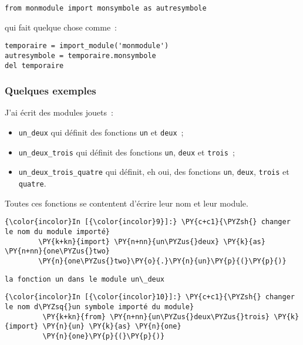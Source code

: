     \begin{verbatim}
from monmodule import monsymbole as autresymbole
\end{verbatim}

    qui fait quelque chose comme~:

    \begin{verbatim}
temporaire = import_module('monmodule')
autresymbole = temporaire.monsymbole
del temporaire
\end{verbatim}

    \hypertarget{quelques-exemples}{%
\subsubsection{Quelques exemples}\label{quelques-exemples}}

    J'ai écrit des modules jouets~:

\begin{itemize}
\tightlist
\item
  \texttt{un\_deux} qui définit des fonctions \texttt{un} et
  \texttt{deux}~;
\item
  \texttt{un\_deux\_trois} qui définit des fonctions \texttt{un},
  \texttt{deux} et \texttt{trois}~;
\item
  \texttt{un\_deux\_trois\_quatre} qui définit, eh oui, des fonctions
  \texttt{un}, \texttt{deux}, \texttt{trois} et \texttt{quatre}.
\end{itemize}

Toutes ces fonctions se contentent d'écrire leur nom et leur module.

    \begin{Verbatim}[commandchars=\\\{\}]
{\color{incolor}In [{\color{incolor}9}]:} \PY{c+c1}{\PYZsh{} changer le nom du module importé}
        \PY{k+kn}{import} \PY{n+nn}{un\PYZus{}deux} \PY{k}{as} \PY{n+nn}{one\PYZus{}two}
        \PY{n}{one\PYZus{}two}\PY{o}{.}\PY{n}{un}\PY{p}{(}\PY{p}{)}
\end{Verbatim}


    \begin{Verbatim}[commandchars=\\\{\}]
la fonction un dans le module un\_deux

    \end{Verbatim}

    \begin{Verbatim}[commandchars=\\\{\}]
{\color{incolor}In [{\color{incolor}10}]:} \PY{c+c1}{\PYZsh{} changer le nom d\PYZsq{}un symbole importé du module}
         \PY{k+kn}{from} \PY{n+nn}{un\PYZus{}deux\PYZus{}trois} \PY{k}{import} \PY{n}{un} \PY{k}{as} \PY{n}{one}
         \PY{n}{one}\PY{p}{(}\PY{p}{)}
\end{Verbatim}


